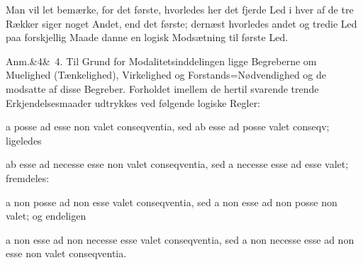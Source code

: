 \documentclass[12pt]{book}
\def\sperr#1{#1}%
\def\textit#1{#1}%
\def\emph#1{#1}%
\newcommand{\sperr}[1]{\textls[180]{#1}}
\newcommand{\anm}[1]{%
  \par\vspace{0.5\baselineskip}%
  \noindent\hspace{\parindent}\sperr{Anm.}\ifx&#1&\else~\textit{#1}.\fi
  \enspace\ignorespaces
}
\newcommand{\opage}[1]{\marginnote{\footnotesize\textit{[#1]}}}
\begin{document}
Man vil let bemærke, for det første, hvorledes her det fjerde Led i hver af de tre Rækker
siger noget Andet, end det første; dernæst hvorledes andet og tredie Led paa forskjellig
Maade danne en \emph{logisk Modsætning} til første Led.

\opage{285} \anm{4} Til Grund for \emph{Modalitetsinddelingen} ligge Begreberne om Muelighed
(Tænkelighed), Virkelighed og Forstands=Nødvendighed og de modsatte af disse Begreber.
Forholdet imellem de hertil svarende trende Erkjendelsesmaader udtrykkes ved følgende
logiske Regler:

\textit{a posse ad esse non valet conseqventia, sed ab esse ad posse valet conseqv;}
ligeledes

\textit{ab esse ad necesse esse non valet conseqventia, sed a necesse esse ad esse valet;}
fremdeles:

\textit{a non posse ad non esse valet conseqventia, sed a non esse ad non posse non valet;}
og endeligen

\textit{a non esse ad non necesse esse valet conseqventia, sed a non necesse esse ad non
esse non valet conseqventia.}
\end{document}
